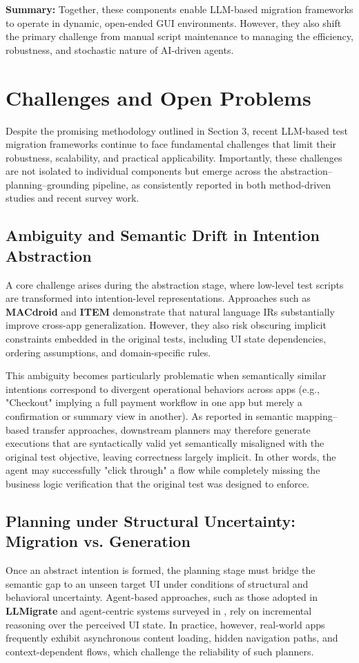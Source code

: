 \documentclass[acmsmall,nonacm]{acmart}
\begin{document}
\textbf{Summary:} Together, these components enable LLM-based migration frameworks to operate in dynamic, open-ended GUI environments. However, they also shift the primary challenge from manual script maintenance to managing the efficiency, robustness, and stochastic nature of AI-driven agents.

\section{Challenges and Open Problems}
Despite the promising methodology outlined in Section 3, recent LLM-based test migration frameworks continue to face fundamental challenges that limit their robustness, scalability, and practical applicability. Importantly, these challenges are not isolated to individual components but emerge across the abstraction–planning–grounding pipeline, as consistently reported in both method-driven studies and recent survey work.

\subsection{Ambiguity and Semantic Drift in Intention Abstraction}
A core challenge arises during the abstraction stage, where low-level test scripts are transformed into intention-level representations. Approaches such as \textbf{MACdroid} \cite{10.1145/3726525} and \textbf{ITEM} \cite{10.1145/3728978} demonstrate that natural language IRs substantially improve cross-app generalization. However, they also risk obscuring implicit constraints embedded in the original tests, including UI state dependencies, ordering assumptions, and domain-specific rules.

This ambiguity becomes particularly problematic when semantically similar intentions correspond to divergent operational behaviors across apps (e.g., "Checkout" implying a full payment workflow in one app but merely a confirmation or summary view in another). As reported in semantic mapping–based transfer approaches, downstream planners may therefore generate executions that are syntactically valid yet semantically misaligned with the original test objective, leaving correctness largely implicit. In other words, the agent may successfully "click through" a flow while completely missing the business logic verification that the original test was designed to enforce.

\subsection{Planning under Structural Uncertainty: Migration vs. Generation}
Once an abstract intention is formed, the planning stage must bridge the semantic gap to an unseen target UI under conditions of structural and behavioral uncertainty. Agent-based approaches, such as those adopted in \textbf{LLMigrate} \cite{10.1145/3728975} and agent-centric systems surveyed in \cite{li2025reusedroidvlmempoweredandroidui}, rely on incremental reasoning over the perceived UI state. In practice, however, real-world apps frequently exhibit asynchronous content loading, hidden navigation paths, and context-dependent flows, which challenge the reliability of such planners.
\end{document}
